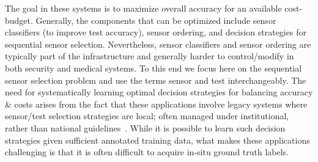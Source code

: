 \documentclass[11pt]{article} %
\newcommand{\ses}{sensor selection\xspace}
\begin{document}
%
The goal in these systems is to maximize overall accuracy for an available cost-budget. Generally, the components that can be optimized include sensor classifiers (to improve test accuracy), sensor ordering, and decision strategies for sequential \ses. Nevertheless, sensor classifiers and sensor ordering are typically part of the infrastructure and generally harder to control/modify in both security and medical systems. To this end we focus here  on the sequential \ses problem and use the terms sensor and test interchangeably. The need for systematically learning optimal decision strategies for balancing accuracy \& costs arises from the fact that these applications involve legacy systems where sensor/test selection strategies are local; often managed under institutional, rather than national guidelines~\cite{baghdadian}. %
While it is possible to learn such decision strategies given sufficient annotated training data, what makes these applications challenging is that it is often difficult to acquire in-situ ground truth labels. 
\end{document}

